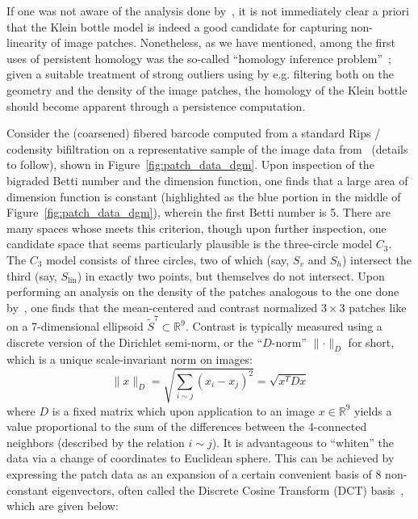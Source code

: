 \documentclass{siamart190516}
\begin{document}
If one was not aware of the analysis done by~\cite{lee2003nonlinear, hateren_schaaf_1998, carlsson2008local, perea2014klein}, it is not immediately clear a priori that the Klein bottle model is indeed a good candidate for capturing non-linearity of image patches. Nonetheless, as we have mentioned, among the first uses of persistent homology was the so-called ``homology inference problem''~\cite{perea2018brief}; given a suitable treatment of strong outliers using by e.g. filtering both on the geometry and the density of the image patches, the homology of the Klein bottle should become apparent through a persistence computation.
 
Consider the (coarsened) fibered barcode computed from a standard Rips / codensity bifiltration on a representative sample of the image data from~\cite{hateren_schaaf_1998} (details to follow), shown in Figure~\ref{fig:patch_data_dgm}. 
Upon inspection of the bigraded Betti number and the dimension function, one finds that a large area of dimension function is constant (highlighted as the blue portion in the middle of Figure~\ref{fig:patch_data_dgm}), wherein the first Betti number is 5. There are many spaces whose  meets this criterion, though upon further inspection, one candidate space that seems particularly plausible is the three-circle model $C_3$. The $C_3$ model consists of three circles, two of which (say, $S_v$ and $S_h$) intersect the third (say, $S_\mathrm{lin}$) in exactly two points, but themselves do not intersect. Upon performing an analysis on the density of the patches analogous to the one done by~\cite{lee2003nonlinear}, one finds that the mean-centered and contrast normalized $3 \times 3$ patches like on a 7-dimensional ellipsoid $\tilde{S}^7 \subset \mathbb{R}^9$. Contrast is typically measured using a discrete version of the Dirichlet semi-norm, or the ``$D$-norm'' $\lVert \cdot \rVert_D$ for short, which is a unique scale-invariant norm on images:
$$ \lVert x \rVert_D = \sqrt{\sum_{i \sim j}(x_i - x_j)^2} = \sqrt{x^T D x}$$
where $D$ is a fixed matrix which upon application to an image $x \in \mathbb{R}^9$ yields a value proportional to the sum of the differences between the 4-connected neighbors (described by the relation $i \sim j$). It is advantageous to ``whiten'' the data via a change of coordinates to Euclidean sphere. 
This can be achieved by expressing the patch data as an expansion of a certain convenient basis of 8 non-constant eigenvectors, often called the Discrete Cosine Transform (DCT) basis~\cite{lee2003nonlinear}, which are given below: 
\end{document}
